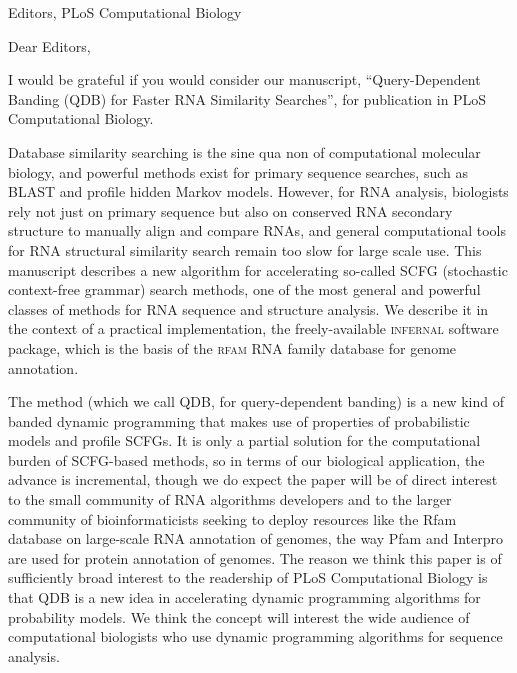 \documentclass{jfrcletter}
\begin{document}
\signature{Sean R. Eddy, Ph.D.}

%
\begin{letter}{Editors, PLoS Computational Biology}

%
\opening{Dear Editors,}

I would be grateful if you would consider our manuscript,
``Query-Dependent Banding (QDB) for Faster RNA Similarity Searches'',
for publication in PLoS Computational Biology.  

Database similarity searching is the sine qua non of computational
molecular biology, and powerful methods exist for primary sequence
searches, such as BLAST and profile hidden Markov models. However, for
RNA analysis, biologists rely not just on primary sequence but also on
conserved RNA secondary structure to manually align and compare RNAs,
and general computational tools for RNA structural similarity search
remain too slow for large scale use. This manuscript describes a new
algorithm for accelerating so-called SCFG (stochastic context-free
grammar) search methods, one of the most general and powerful classes
of methods for RNA sequence and structure analysis. We describe it in
the context of a practical implementation, the freely-available
\textsc{infernal} software package, which is the basis of the
\textsc{rfam} RNA family database for genome annotation.

The method (which we call QDB, for query-dependent banding) is a new
kind of banded dynamic programming that makes use of properties of
probabilistic models and profile SCFGs. It is only a partial solution
for the computational burden of SCFG-based methods, so in terms of our
biological application, the advance is incremental, though we do
expect the paper will be of direct interest to the small community of
RNA algorithms developers and to the larger community of
bioinformaticists seeking to deploy resources like the Rfam database
on large-scale RNA annotation of genomes, the way Pfam and Interpro
are used for protein annotation of genomes.  The reason we think this
paper is of sufficiently broad interest to the readership of PLoS
Computational Biology is that QDB is a new idea in accelerating
dynamic programming algorithms for probability models. We think the
concept will interest the wide audience of computational biologists
who use dynamic programming algorithms for sequence analysis.


\end{letter}
\end{document}
